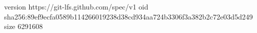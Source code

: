 version https://git-lfs.github.com/spec/v1
oid sha256:89ef9ecfa0589b114266019238d38cd934aa724b3306f3a382b2c72e03d5d249
size 6291608
